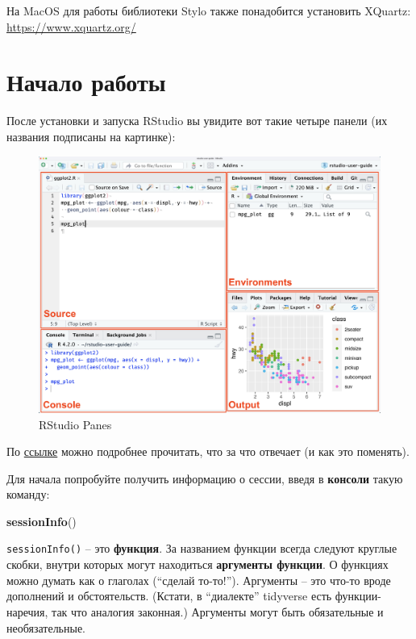 \documentclass[
]{book}
\newenvironment{Shaded}{\begin{snugshade}}{\end{snugshade}}
\newcommand{\FunctionTok}[1]{\textcolor[rgb]{0.13,0.29,0.53}{\textbf{#1}}}
\newcommand{\NormalTok}[1]{#1}
\theoremstyle{definition}
\theoremstyle{definition}
\theoremstyle{definition}
\theoremstyle{definition}
\theoremstyle{remark}
\begin{document}
На MacOS для работы библиотеки Stylo также понадобится установить XQuartz: \url{https://www.xquartz.org/}

\hypertarget{ux43dux430ux447ux430ux43bux43e-ux440ux430ux431ux43eux442ux44b}{%
\section{Начало работы}\label{ux43dux430ux447ux430ux43bux43e-ux440ux430ux431ux43eux442ux44b}}

После установки и запуска RStudio вы увидите вот такие четыре панели (их названия подписаны на картинке):

\begin{figure}
\centering
\includegraphics{images/panes.jpeg}
\caption{RStudio Panes}
\end{figure}

По \href{https://docs.posit.co/ide/user/ide/guide/ui/ui-panes.html}{ссылке} можно подробнее прочитать, что за что отвечает (и как это поменять).

Для начала попробуйте получить информацию о сессии, введя в \textbf{консоли} такую команду:

\begin{Shaded}
\begin{Highlighting}[]
\FunctionTok{sessionInfo}\NormalTok{()}
\end{Highlighting}
\end{Shaded}

\texttt{sessionInfo()} -- это \textbf{функция}. За названием функции всегда следуют круглые скобки, внутри которых могут находиться \textbf{аргументы функции}. О функциях можно думать как о глаголах (``сделай то-то!''). Аргументы -- это что-то вроде дополнений и обстоятельств. (Кстати, в ``диалекте'' tidyverse есть функции-наречия, так что аналогия законная.) Аргументы могут быть обязательные и необязательные.
\end{document}
